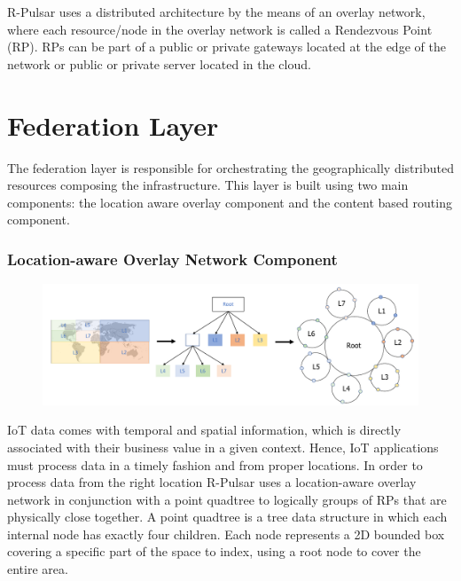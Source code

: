 R-Pulsar uses a distributed architecture by the means of an overlay network, where each resource/node in the overlay network is called a Rendezvous Point (RP). RPs can be part of a public or private gateways located at the edge of the network or public or private server located in the cloud. 

\section{Federation Layer}
The federation layer is responsible for orchestrating the geographically distributed resources composing the infrastructure. This layer is built using two main components: the location aware overlay component and the content based routing component.

\subsubsection{Location-aware Overlay Network Component}

\begin{figure}[!h]
  \centering
  \includegraphics[width=1\columnwidth]{Figures/quadtree.pdf}
  \caption{}\label{fig:quadT}
\end{figure}

IoT data comes with temporal and spatial information, which is directly associated with their business value in a given context. Hence, IoT applications must process data in a timely fashion and from proper locations. In order to process data from the right location R-Pulsar uses a location-aware overlay network in conjunction with a point quadtree to logically groups of RPs that are physically close together. A point quadtree is a tree data structure in which each internal node has exactly four children. Each node represents a 2D bounded box covering a specific part of the space to index, using a root node to cover the entire area.


